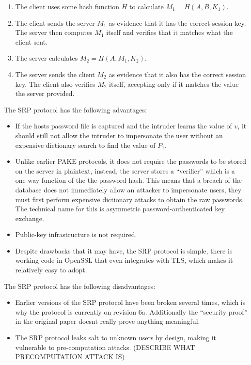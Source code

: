 \documentclass[11pt]{article}
\let\oldcite=\cite
\renewcommand\cite[1]{\ifthenelse{\equal{#1}{NEEDED}}{[citation~needed]}{\oldcite{#1}}}
\begin{document}
\begin{enumerate}
\item The client uses some hash function $H$ to calculate $M_1=H(A,B,K_1)$.
\item The client sends the server $M_1$ as evidence that it has the correct session key. The server then computes $M_1$ itself and verifies that it matches what the client sent.
\item The server calculates $M_2=H(A,M_1,K_2)$.
\item The server sends the client $M_2$ as evidence that it also has the correct session key, The client also verifies $M_2$ itself, accepting only if it matches the value the server provided.
\end{enumerate}
The SRP protocol has the following advantages:
\begin{itemize}
\item If the hosts password file is captured and the intruder learns the value of $v$, it should still not allow the intruder to impersonate the user without an expensive dictionary search to find the value of $P_1$.
\item Unlike earlier PAKE protocols, it does not require the passwords to be stored on the server in plaintext, instead, the server stores a ``verifier'' which is a one-way function of the the password hash. This means that a breach of the database does not immediately allow an attacker to impersonate users, they must first perform expensive dictionary attacks to obtain the raw passwords. The technical name for this is asymmetric password-authenticated key exchange.
\item Public-key infrastructure is not required.
\item Despite drawbacks that it may have, the SRP protocol is simple, there is working code in OpenSSL that even integrates with TLS, which makes it relatively easy to adopt.
\end{itemize}
The SRP protocol has the following disadvantages:
\begin{itemize}
\item Earlier versions of the SRP protocol have been broken several times, which is why the protocol is currently on revision 6a. Additionally the ``security proof'' in the original paper doesnt really prove anything meaningful.
\item The SRP protocol leaks salt to unknown users by design, making it vulnerable to pre-computation attacks. (DESCRIBE WHAT PRECOMPUTATION ATTACK IS)
\end{itemize}
\cite{green2018pake}
\end{document}
